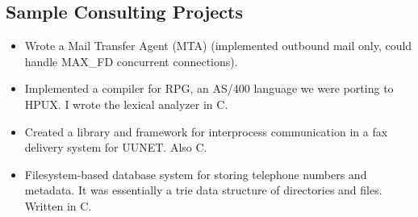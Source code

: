 \documentclass[margin]{res}
\begin{document}
\begin{resume}
\section{Sample Consulting Projects}
\begin{itemize} \itemsep -2pt %
\item Wrote a Mail Transfer Agent (MTA) (implemented outbound mail only, could handle MAX\_FD concurrent connections).
\item Implemented a compiler for RPG, an AS/400 language we were porting to HPUX.  I wrote the lexical analyzer in C.
\item Created a library and framework for interprocess communication in a fax delivery system for UUNET. Also C.
\item Filesystem-based database system for storing telephone numbers and metadata.  It was essentially a trie data structure of directories and files.  Written in C.
\end{itemize}
\end{resume}
\end{document}
